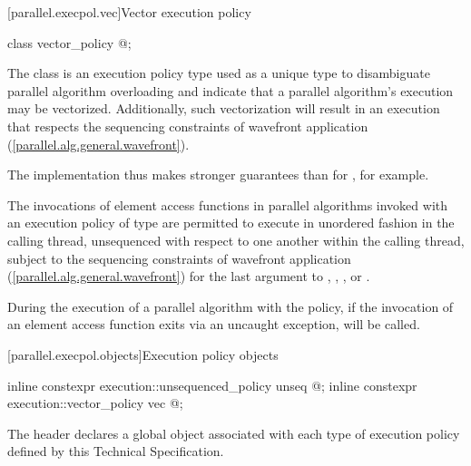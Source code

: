 [parallel.execpol.vec]{Vector execution policy}

\begin{codeblock}
class vector_policy { @\unspec@ };
\end{codeblock}

\pnum
The class  is an execution policy type used as a
unique type to disambiguate parallel algorithm overloading and indicate that a
parallel algorithm's execution may be vectorized. Additionally, such
vectorization will result in an execution that respects the sequencing
constraints of wavefront application
(\hyperref[parallel.alg.general.wavefront]{[parallel.alg.general.wavefront]}).
\begin{note}The implementation thus makes stronger guarantees than for
, for example.\end{note}

\pnum
The invocations of element access functions in parallel algorithms
invoked with an execution policy of type  are permitted to
execute in unordered fashion in the calling thread, unsequenced with respect to
one another within the calling thread, subject to the sequencing constraints of
wavefront application
(\hyperref[parallel.alg.general.wavefront]{[parallel.alg.general.wavefront]})
for the last argument to , ,
, or .

\pnum
During the execution of a parallel algorithm with the
 policy, if the invocation of an
element access function exits via an uncaught exception, 
will be called.

[parallel.execpol.objects]{Execution policy objects}

\begin{codeblock}
inline constexpr execution::unsequenced_policy unseq{ @\unspec@ };
inline constexpr execution::vector_policy vec{ @\unspec@ };
\end{codeblock}

\pnum
The header  declares a global object
associated with each type of execution policy defined by this Technical
Specification.

